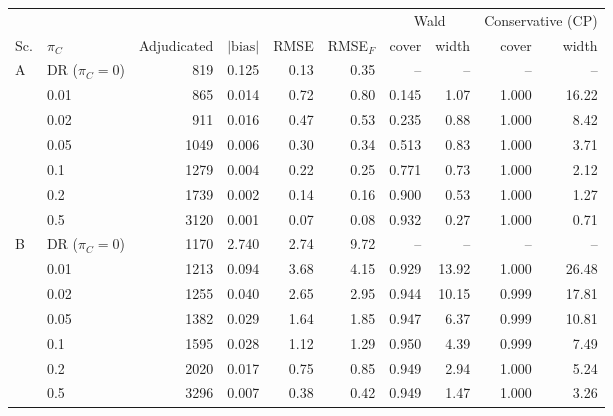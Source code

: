 \begin{tabular}{llrrrrrrrr}
\toprule
 & & & & & & \multicolumn{2}{c}{Wald} & \multicolumn{2}{c}{Conservative (CP)} \\
\cmidrule(lr){7-8}\cmidrule(lr){9-10}
Sc. & $\pi_C$ & Adjudicated & $|\text{bias}|$ & RMSE & RMSE$_F$ & cover & width & cover & width \\
\midrule
\multirow{7}{*}{A} & DR ($\pi_C=0$) & 819 & 0.125 & 0.13 & 0.35 & -- & -- & -- & -- \\
 & 0.01 & 865 & 0.014 & 0.72 & 0.80 & 0.145 & 1.07 & 1.000 & 16.22 \\
 & 0.02 & 911 & 0.016 & 0.47 & 0.53 & 0.235 & 0.88 & 1.000 & 8.42 \\
 & 0.05 & 1049 & 0.006 & 0.30 & 0.34 & 0.513 & 0.83 & 1.000 & 3.71 \\
 & 0.1 & 1279 & 0.004 & 0.22 & 0.25 & 0.771 & 0.73 & 1.000 & 2.12 \\
 & 0.2 & 1739 & 0.002 & 0.14 & 0.16 & 0.900 & 0.53 & 1.000 & 1.27 \\
 & 0.5 & 3120 & 0.001 & 0.07 & 0.08 & 0.932 & 0.27 & 1.000 & 0.71 \\
\midrule
\multirow{7}{*}{B} & DR ($\pi_C=0$) & 1170 & 2.740 & 2.74 & 9.72 & -- & -- & -- & -- \\
 & 0.01 & 1213 & 0.094 & 3.68 & 4.15 & 0.929 & 13.92 & 1.000 & 26.48 \\
 & 0.02 & 1255 & 0.040 & 2.65 & 2.95 & 0.944 & 10.15 & 0.999 & 17.81 \\
 & 0.05 & 1382 & 0.029 & 1.64 & 1.85 & 0.947 & 6.37 & 0.999 & 10.81 \\
 & 0.1 & 1595 & 0.028 & 1.12 & 1.29 & 0.950 & 4.39 & 0.999 & 7.49 \\
 & 0.2 & 2020 & 0.017 & 0.75 & 0.85 & 0.949 & 2.94 & 1.000 & 5.24 \\
 & 0.5 & 3296 & 0.007 & 0.38 & 0.42 & 0.949 & 1.47 & 1.000 & 3.26 \\
\bottomrule
\end{tabular}
